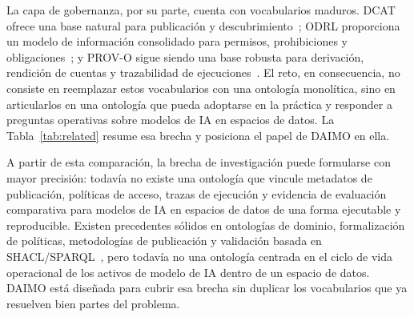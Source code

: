 \documentclass[11pt,a4paper]{article}
\begin{document}
La capa de gobernanza, por su parte, cuenta con vocabularios maduros. DCAT ofrece una base natural para publicación y descubrimiento~\cite{dcat2}; ODRL proporciona un modelo de información consolidado para permisos, prohibiciones y obligaciones~\cite{odrl22}; y PROV-O sigue siendo una base robusta para derivación, rendición de cuentas y trazabilidad de ejecuciones~\cite{provo}. El reto, en consecuencia, no consiste en reemplazar estos vocabularios con una ontología monolítica, sino en articularlos en una ontología que pueda adoptarse en la práctica y responder a preguntas operativas sobre modelos de IA en espacios de datos. La Tabla~\ref{tab:related} resume esa brecha y posiciona el papel de DAIMO en ella.

A partir de esta comparación, la brecha de investigación puede formularse con mayor precisión: todavía no existe una ontología que vincule metadatos de publicación, políticas de acceso, trazas de ejecución y evidencia de evaluación comparativa para modelos de IA en espacios de datos de una forma ejecutable y reproducible. Existen precedentes sólidos en ontologías de dominio, formalización de políticas, metodologías de publicación y validación basada en SHACL/SPARQL~\cite{kurteva,palma,pandit-esteves,penteado23,bareedu24,ferranti}, pero todavía no una ontología centrada en el ciclo de vida operacional de los activos de modelo de IA dentro de un espacio de datos. DAIMO está diseñada para cubrir esa brecha sin duplicar los vocabularios que ya resuelven bien partes del problema.
\end{document}
